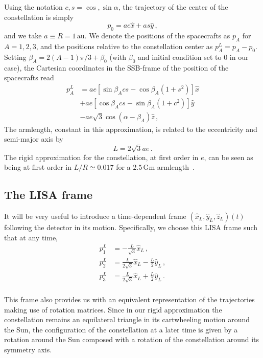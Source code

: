 \documentclass[aps,showpacs,twocolumn,prd,superscriptaddress,nofootinbib]{revtex4-1}
\newcommand{\be}{\begin{equation}}
\newcommand{\ee}{\end{equation}}
\newcommand{\bsub}{\begin{subequations}}
\newcommand{\esub}{\end{subequations}}
\newcommand{\nn}{\nonumber}
\begin{document}
Using the notation $c,s = \cos, \sin \alpha$, the trajectory of the center of the constellation is simply
\be
	p_{0} = ac \hat{x} + as \hat{y} \,,
\ee
and we take $a\equiv R = 1 \, \mathrm{au}$. We denote the positions of the spacecrafts as $p_{A}$ for $A=1,2,3$, and the positions relative to the constellation center as $p_{A}^{L} = p_{A} - p_{0}$. Setting $\beta_{A} = 2(A-1)\pi/3 + \beta_{0}$ (with $\beta_{0}$ and initial condition set to 0 in our case), the Cartesian coordinates in the SSB-frame of the position of the spacecrafts read~\cite{}
\bsub
\begin{align}
	p_{A}^{L} &= a e \left[ \sin \beta_{A} c s - \cos\beta_{A} \left( 1 + s^{2} \right) \right] \hat{x} \nn\\
	& + a e \left[ \cos \beta_{A} c s - \sin\beta_{A} \left( 1 + c^{2} \right) \right] \hat{y} \nn\\
	& - a e \sqrt{3} \cos(\alpha - \beta_{A}) \hat{z} \,,
\end{align}
\esub
The armlength, constant in this approximation, is related to the eccentricity and semi-major axis by
\be
	L = 2\sqrt{3} a e \,.
\ee
The rigid approximation for the constellation, at first order in $e$, can be seen as being at first order in $L/R \simeq 0.017$ for a $2.5 \, \mathrm{Gm}$ armlength~\cite{}.


\subsection{The LISA frame}
\label{sec:LISAframe}

It will be very useful to introduce a time-dependent frame $(\hat{x}_{L}, \hat{y}_{L}, \hat{z}_{L})(t)$ following the detector in its motion. Specifically, we choose this LISA frame such that at any time,
\bsub
\begin{align}
	p_{1}^{L} &= - \frac{L}{\sqrt{3}} \hat{x}_{L} \,,\\
	p_{2}^{L} &= \frac{L}{2\sqrt{3}} \hat{x}_{L} - \frac{L}{2} \hat{y}_{L} \,,\\
	p_{3}^{L} &= \frac{L}{2\sqrt{3}} \hat{x}_{L} + \frac{L}{2} \hat{y}_{L} \,.\\
\end{align}
\esub

This frame also provides us with an equivalent representation of the trajectories making use of rotation matrices. Since in our rigid approximation the constellation remains an equilateral triangle in its cartwheeling motion around the Sun, the configuration of the constellation at a later time is given by a rotation around the Sun composed with a rotation of the constellation around its symmetry axis.
\end{document}
